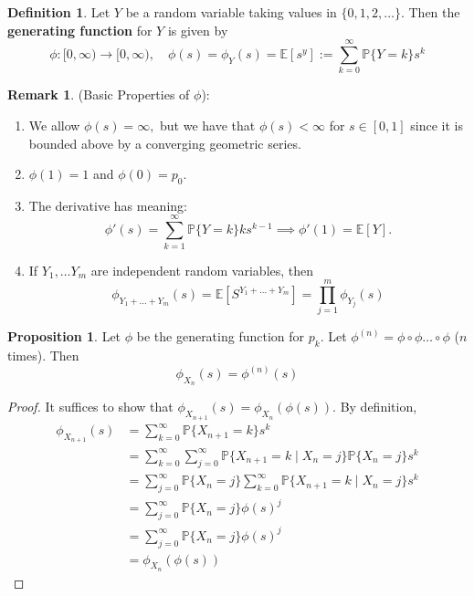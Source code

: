 \documentclass[10pt, oneside]{article}
\newcommand{\bbP}{\mathbb{P}}
\newcommand{\bbE}{\mathbb{E}}
\theoremstyle{definition}
\newtheorem{defn}{Definition}
\newtheorem{prop}{Proposition}
\newtheorem{rem}{Remark}
\begin{document}
\begin{defn}
    Let $Y$ be a random variable taking values in $\{0,1,2,\dots\}.$ Then the \textbf{generating function} for $Y$ is given by 
    \[\phi : [0, \infty) \to [0,\infty), \quad \phi(s) = \phi_Y(s) = \bbE[s^y] := \sum_{k=0}^\infty \bbP\{Y = k\}s^k\]
\end{defn}
\begin{rem}
    (Basic Properties of $\phi$):
    \begin{enumerate}
        \item We allow $\phi(s) = \infty,$ but we have that $\phi(s) < \infty$ for $s\in [0,1]$ since it is bounded above by a converging geometric series. 
        \item $\phi (1) = 1$ and $\phi(0) = p_0.$ 
        \item The derivative has meaning:
        \[\phi'(s) = \sum_{k=1}^\infty \bbP\{Y = k\} k s^{k-1} \implies \phi'(1) = \bbE[Y].\]
        \item If $Y_1, \dots Y_m$ are independent random variables, then 
        \[\phi_{Y_1 + \dots + Y_m}(s) = \bbE[S^{Y_1 + \dots + Y_m}] = \prod_{j=1}^m \phi_{Y_j}(s)\]
    \end{enumerate}
    \end{rem}

\begin{prop}
    Let $\phi$ be the generating function for $p_k.$ Let $\phi^{(n)} = \phi \circ \phi \dots \circ \phi$ ($n$ times). Then
    \[\phi_{X_n}(s) = \phi^{(n)}(s)\]
\end{prop}
\begin{proof}
    It suffices to show that $\phi_{X_{n+1}}(s) = \phi_{X_{n}}(\phi(s)).$ By definition, 
    \begin{align*}
        \phi_{X_{n+1}}(s) &= \sum_{k=0}^\infty \bbP\{X_{n+1} = k\}s^k\\
        &= \sum_{k=0}^\infty \sum_{j=0}^\infty \bbP\{X_{n+1} = k \mid X_n = j\}\bbP\{X_n = j\} s^k\\
        &= \sum_{j=0}^\infty \bbP\{X_n = j\}\sum_{k=0}^\infty \bbP\{X_{n+1} = k \mid X_n = j\}s^k\\
        &= \sum_{j=0}^\infty \bbP\{X_n = j\} \phi(s)^j\\
        &= \sum_{j=0}^\infty \bbP\{X_n = j\} \phi(s)^j\\
        &= \phi_{X_n}(\phi(s))
    \end{align*}
\end{proof}

\newpage
\end{document}
